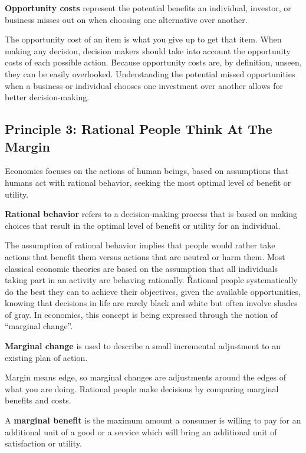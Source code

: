 \textbf{Opportunity costs} represent the potential benefits an individual, investor, or business misses out on when
choosing one alternative over another.
\ed

The opportunity cost of an item is what you give up to get that item. When making any decision, decision makers should
take into account the opportunity costs of each possible action. \v

Because opportunity costs are, by definition, unseen, they can be easily overlooked. Understanding the potential
missed opportunities when a business or individual chooses one investment over another allows for better
decision-making.

\subsection*{Principle 3: Rational People Think At The Margin}

Economics focuses on the actions of human beings, based on assumptions that humans act with rational behavior, seeking
the most optimal level of benefit or utility.

\textbf{Rational behavior} refers to a decision-making process that is based on making choices that result in the
optimal level of benefit or utility for an individual.
\ed

The assumption of rational behavior implies that people would rather take actions that benefit them versus actions
that are neutral or harm them. Most classical economic theories are based on the assumption that all individuals
taking part in an activity are behaving rationally. \v

Rational people systematically do the best they can to achieve their objectives, given the available opportunities,
knowing that decisions in life are rarely black and white but often involve shades of gray. In economics, this
concept is being expressed through the notion of ``marginal change''.

\textbf{Marginal change} is used to describe a small incremental adjustment to an existing plan of action.
\ed

Margin means edge, so marginal changes are adjustments around the edges of what you are doing. Rational people make
decisions by comparing marginal benefits and costs.

A \textbf{marginal benefit} is the maximum amount a consumer is willing to pay for an additional unit of a good or a
service which will bring an additional unit of satisfaction or utility.
\ed

